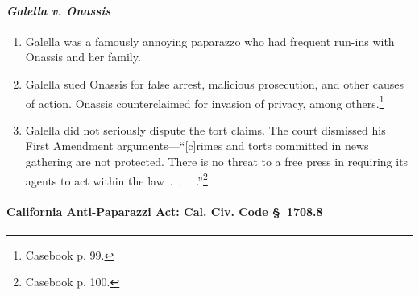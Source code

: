 \paragraph{\emph{Galella v. Onassis}}

\begin{enumerate}
    \item Galella was a famously annoying paparazzo who had frequent run-ins 
    with Onassis and her family.
    \item Galella sued Onassis for false arrest, malicious prosecution, and 
    other causes of action. Onassis counterclaimed for invasion of privacy, 
    among others.\footnote{Casebook p. 99.}
    \item Galella did not seriously dispute the tort claims. The court dismissed 
    his First Amendment arguments---``[c]rimes and torts committed in news 
    gathering are not protected. There is no threat to a free press in requiring 
    its agents to act within the law~.~.~.~.''\footnote{Casebook p. 100.}
\end{enumerate}

\paragraph{California Anti-Paparazzi Act: Cal. Civ. Code \S\ 1708.8}

